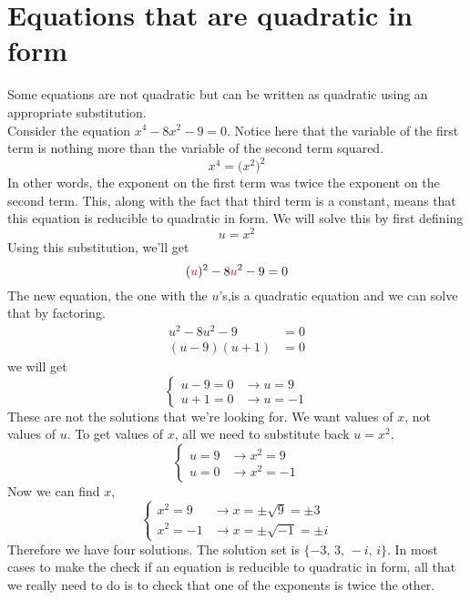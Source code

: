 \section{Equations that are quadratic in form}
Some equations are not quadratic but can be written as quadratic using an appropriate substitution. \\
Consider the equation $x^4-8x^2-9=0$. Notice here that the variable of the first term is nothing more than the variable of the second term squared.
\[
            x^4 = \bigl(x^2\bigr)^2
\]
In other words, the exponent on the first term was twice the exponent on the second term. This, along with the fact that third term is a constant, means that this equation is reducible to quadratic in form.  We will solve this by first defining
\[
        u= x^2
\]
Using this substitution, we'll get
\[
        (\textcolor{red}{u})^2-8\textcolor{red}{u}^2-9=0
\]
The new equation, the one with the $u$’s,is a quadratic equation and we can solve that by factoring.
\begin{align*}
    u^2-8u^2-9 &=0\\
    (u-9)(u+1) &=0
\end{align*}
we will get
	\[ \begin{cases}
		u-9=0  & \rightarrow u=9 \\
		u+1=0  & \rightarrow u=-1
	\end{cases} \]
These are not the solutions that we’re looking for.  We want values of $x$, not values of $u$. To get values of $x$, all we need to substitute back $u=x^2$.
	\[ \begin{cases}
		u=9  & \rightarrow x^2=9 \\
		u=0  & \rightarrow x^2=-1
	\end{cases} \]
Now we can find $x$,
	\[ \begin{cases}
		x^2=9   & \rightarrow x=\pm{\sqrt{9}}=\pm3 \\
		x^2=-1  & \rightarrow x=\pm\sqrt{-1}=\pm{i}
	\end{cases} \]
Therefore we have four solutions. The solution set is $\{-3,\,3,\,-i,\,i\}$. In most cases to make the check if an equation is reducible to quadratic in form, all that we really need to do is to check that one of the exponents is twice the other.
\vspace{0.4cm}
